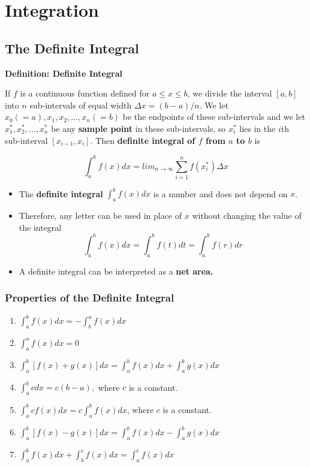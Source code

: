\documentclass[]{book}
\providecommand{\tightlist}{%
  \setlength{\itemsep}{0pt}\setlength{\parskip}{0pt}}
\begin{document}
\newpage

\hypertarget{integration}{%
\section{Integration}\label{integration}}

\hypertarget{the-definite-integral}{%
\subsection{The Definite Integral}\label{the-definite-integral}}

\textbf{Definition: Definite Integral}

If \(f\) is a continuous function defined for \(a \leq x \leq b\), we divide the interval \([a,b]\) into \(n\) sub-intervals of equal width \(\Delta x = (b-a)/n\). We let \(x_0 (=a) , x_1, x_2, \dots, x_n(=b)\) be the endpoints of these sub-intervals and we let \(x_1^*,x_2^*, \dots, x_n^*\) be any \textbf{sample point} in these sub-intervals, so \(x_i^*\) lies in the \(i\)th sub-interval \([x_{i-1} , x_i]\). Then \textbf{definite integral of \(f\) from \(a\) to \(b\) } is

\[\int_a^b f(x) dx = lim_{n\to \infty}\sum_{i=1}^n f(x_i^*) \Delta x \]

\begin{itemize}
\item
  The \textbf{definite integral} \(\int_a^b f(x) dx\) is a number and does not depend on \(x\).
\item
  Therefore, any letter can be used in place of \(x\) without changing the value of the integral
  \[\int_a^b f(x) dx= \int_a^b f(t) dt = \int_a^b f(r) dr\]
  \newpage
\item
  A definite integral can be interpreted as a \textbf{net area.}
\end{itemize}

\newpage

\hypertarget{properties-of-the-definite-integral}{%
\subsubsection{Properties of the Definite Integral}\label{properties-of-the-definite-integral}}

\begin{enumerate}
\def\labelenumi{\arabic{enumi}.}
\tightlist
\item
  \(\int_a^b f(x) dx= -\int_b^a f(x) dx\)
\item
  \(\int_a^a f(x) dx= 0\)
\item
  \(\int_a^b[ f(x)+ g(x)] dx= \int_a^b f(x) dx + \int_a^b g(x)dx\)
\item
  \(\int_a^b c dx= c(b-a),\) where \(c\) is a constant.
\item
  \(\int_a^b c f(x) dx= c\int_a^b f(x) dx\), where \(c\) is a constant.
\item
  \(\int_a^b[ f(x)- g(x)] dx= \int_a^b f(x) dx - \int_a^b g(x)dx\)
\item
  \(\int_a^b f(x) dx + \int_b^c f(x)dx = \int_a^c f(x) dx\)
\end{enumerate}
\end{document}
